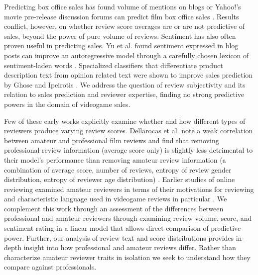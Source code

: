 \documentclass[letterpaper]{article}
\begin{document}
Predicting box office sales has found volume of mentions on blogs or Yahoo!'s movie pre-release discussion forums can predict film box office sales \cite{liu2001word,duan2008online}. Results conflict, however, on whether review score averages are \cite{dellarocas2007exploring} or are not \cite{liu2001word,duan2008online} predictive of sales, beyond the power of pure volume of reviews.
Sentiment has also often proven useful in predicting sales. Yu et al. found sentiment expressed in blog posts can improve an autoregressive model through a carefully chosen lexicon of sentiment-laden words \cite{yu2012mining}. Specialized classifiers that differentiate product description text from opinion related text were shown to improve sales prediction by Ghose and Ipeirotis \cite{ghose2007designing}. 
We address the question of review subjectivity and its relation to sales prediction and reviewer expertise, finding no strong predictive powers in the domain of videogame sales.

Few of these early works explicitly examine whether and how different types of reviewers produce varying review scores. Dellarocas et al. note a weak correlation between amateur and professional film reviews and find that removing professional review information (average score only) is slightly less detrimental to their model's performance than removing amateur review information (a combination of average score, number of reviews, entropy of review gender distribution, entropy of reviewer age distribution) \cite{dellarocas2007exploring}. Earlier studies of online reviewing examined amateur reviewers in terms of their motivations for reviewing \cite{gilbert2010deja} and characteristic language used in videogame reviews in particular \cite{zagal2011natural}. We complement this work through an assessment of the differences between professional and amateur reviewers through examining review volume, score, and sentiment rating in a linear model that allows direct comparison of predictive power. Further, our analysis of review text and score distributions provides in-depth insight into how professional and amateur reviews differ. Rather than characterize amateur reviewer traits in isolation we seek to understand how they compare against professionals.
\end{document}
